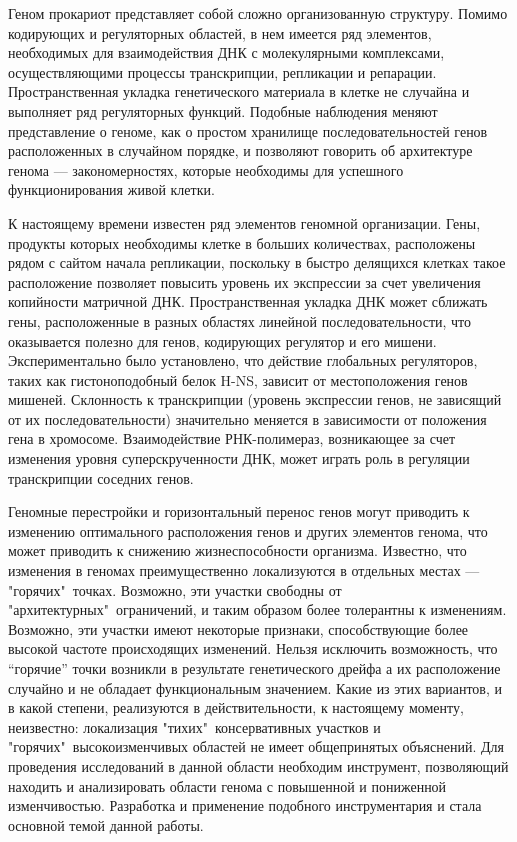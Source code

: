 
{\actuality} Геном прокариот представляет собой сложно организованную структуру. Помимо кодирующих и регуляторных областей, в нем имеется ряд элементов, необходимых для взаимодействия ДНК с молекулярными комплексами, осуществляющими процессы транскрипции, репликации и репарации. Пространственная укладка генетического материала в клетке не случайна и выполняет ряд регуляторных функций. Подобные наблюдения меняют представление о геноме, как о простом хранилище последовательностей генов расположенных в случайном порядке, и позволяют говорить об архитектуре генома --- закономерностях, которые необходимы для успешного функционирования живой клетки.

К настоящему времени известен ряд элементов геномной организации. Гены, продукты которых необходимы клетке в больших количествах, расположены рядом с сайтом начала репликации, поскольку в быстро делящихся клетках такое расположение позволяет повысить уровень их экспрессии за счет увеличения копийности матричной ДНК. Пространственная укладка ДНК может сближать гены, расположенные в разных областях линейной последовательности, что оказывается полезно для генов, кодирующих регулятор и его мишени. Экспериментально было установлено, что действие глобальных регуляторов, таких как гистоноподобный белок H-NS, зависит от местоположения генов мишеней. Склонность к транскрипции (уровень экспрессии генов, не зависящий от их последовательности) значительно меняется в зависимости от положения гена в хромосоме. Взаимодействие РНК-полимераз, возникающее за счет изменения уровня суперскрученности ДНК, может играть роль в регуляции транскрипции соседних генов.

Геномные перестройки и горизонтальный перенос генов могут приводить к изменению оптимального расположения генов и других элементов генома, что может приводить к снижению жизнеспособности организма. Известно, что изменения в геномах преимущественно локализуются в отдельных местах --- "горячих"\ точках. Возможно, эти участки свободны от "архитектурных"\ ограничений, и таким образом более толерантны к изменениям. Возможно, эти участки имеют некоторые признаки, способствующие более высокой частоте происходящих изменений. Нельзя исключить возможность, что ``горячие'' точки возникли в результате генетического дрейфа а их расположение случайно и не обладает функциональным значением. Какие из этих вариантов, и в какой степени, реализуются в действительности, к настоящему моменту, неизвестно: локализация "тихих"\ консервативных участков и "горячих"\ высокоизменчивых областей не имеет общепринятых объяснений. Для проведения исследований в данной области необходим инструмент, позволяющий находить и анализировать области генома с повышенной и пониженной изменчивостью. Разработка и применение подобного инструментария и стала основной темой данной работы. 


